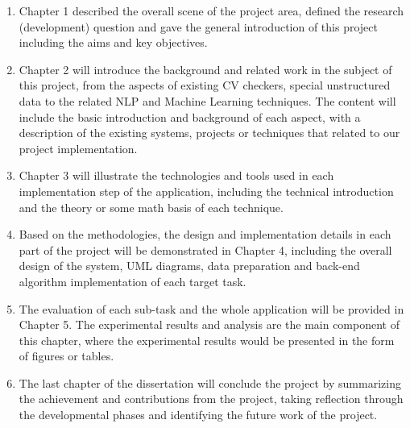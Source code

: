 \begin{enumerate}
    \item Chapter 1 described the overall scene of the project area, defined the research (development) question and gave the general introduction of this project including the aims and key objectives.
    
    \item Chapter 2 will introduce the background and related work in the subject of this project, from the aspects of existing CV checkers, special unstructured data to the related NLP and Machine Learning techniques. The content will include the basic introduction and background of each aspect, with a description of the existing systems, projects or techniques that related to our project implementation.
    
    \item Chapter 3 will illustrate the technologies and tools used in each implementation step of the application, including the technical introduction and the theory or some math basis of each technique.
    
    
    \item Based on the methodologies, the design and implementation details in each part of the project will be demonstrated in Chapter 4, including the overall design of the system, UML diagrams, data preparation and back-end algorithm implementation of each target task.
    
    \item The evaluation of each sub-task and the whole application will be provided in Chapter 5. The experimental results and analysis are the main component of this chapter, where the experimental results would be presented in the form of figures or tables.
    
    \item The last chapter of the dissertation will conclude the project by summarizing the achievement and contributions from the project, taking reflection through the developmental phases and identifying the future work of the project. 
    
\end{enumerate}

